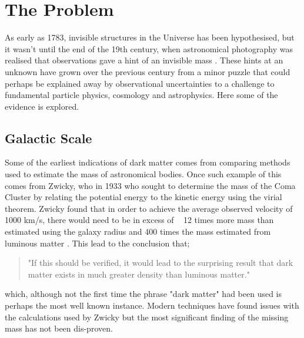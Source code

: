 \section{The Problem}

\par
As early as 1783, invisible structures in the Universe has been hypothesised, but it wasn't until the end of the 19th century, when astronomical photography was realised that observations gave a hint of an invisible mass  \cite{History_Of_Dark_Matter_2018_ref}.
These hints at an unknown have grown over the previous century from a minor puzzle that could perhaps be explained away by observational uncertainties to a challenge to fundamental particle physics, cosmology and astrophysics.
Here some of the evidence is explored.

%
%


\subsection{Galactic Scale}

\par
Some of the earliest indications of dark matter comes from comparing methods used to estimate the mass of astronomical bodies.
Once such example of this comes from Zwicky, who in 1933 who sought to determine the mass of the Coma Cluster by relating the potential energy to the kinetic energy using the virial theorem.
Zwicky found that in order to achieve the average observed velocity of 1000 km/s, there would need to be in excess of ~ 12 times more mass than estimated using the galaxy radius and 400 times the mass estimated from luminous matter \cite{Fritz_Zwicky_1933_ref}.
This lead to the conclusion that; 
\begin{quote}
"If this should be verified, it would lead to the surprising result that dark matter
exists in much greater density than luminous matter."
\end{quote}
which, although not the first time the phrase "dark matter" had been used is perhaps the most well known instance.
Modern techniques have found issues with the calculations used by Zwicky but the most significant finding of the missing mass has not been dis-proven.

